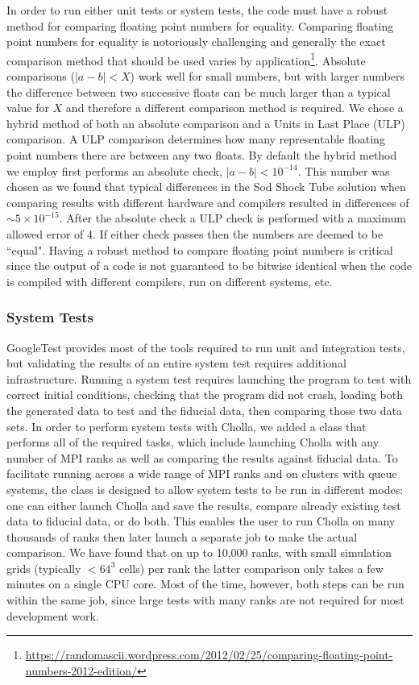 \documentclass[modern, linenumbers]{aastex631}
\begin{document}
In order to run either unit tests or system tests, the code must have a robust method for comparing floating point numbers for equality. Comparing floating point numbers for equality is notoriously challenging and generally the exact comparison method that should be used varies by application\citep{goldberg_1991,muller_2018}\footnote{\url{https://randomascii.wordpress.com/2012/02/25/comparing-floating-point-numbers-2012-edition/}}. Absolute comparisons ($|a-b| < X$) work well for small numbers, but with larger numbers the difference between two successive floats can be much larger than a typical value for $X$ and therefore a different comparison method is required. We chose a hybrid method of both an absolute comparison and a Units in Last Place (ULP) comparison. A ULP comparison determines how many representable floating point numbers there are between any two floats. By default the hybrid method we employ first performs an absolute check, $|a-b| < 10^{-14}$. This number was chosen as we found that typical differences in the Sod Shock Tube solution when comparing results with different hardware and compilers resulted in differences of $\sim5\times10^{-15}$. After the absolute check a ULP check is performed with a maximum allowed error of 4. If either check passes then the numbers are deemed to be ``equal". Having a robust method to compare floating point numbers is critical since the output of a code is not guaranteed to be bitwise identical when the code is compiled with different compilers, run on different systems, etc.

\subsubsection{System Tests}

GoogleTest provides most of the tools required to run unit and integration tests, but validating the results of an entire system test requires additional infrastructure. Running a system test requires launching the program to test with correct initial conditions, checking that the program did not crash, loading both the generated data to test and the fiducial data, then comparing those two data sets. In order to perform system tests with Cholla, we added a class that performs all of the required tasks, which include launching Cholla with any number of MPI ranks as well as comparing the results against fiducial data. To facilitate running across a wide range of MPI ranks and on clusters with queue systems, the class is designed to allow system tests to be run in different modes: one can either launch Cholla and save the results, compare already existing test data to fiducial data, or do both. This enables the user to run Cholla on many thousands of ranks then later launch a separate job to make the actual comparison. We have found that on up to 10,000 ranks, with small simulation grids (typically $<64^3$ cells) per rank the latter comparison only takes a few minutes on a single CPU core. Most of the time, however, both steps can be run within the same job, since large tests with many ranks are not required for most development work.
\end{document}
